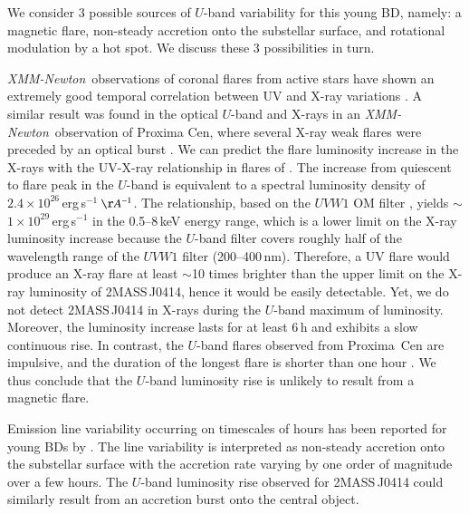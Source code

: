 \documentclass{aa}
\newcommand{\xmm}{{\it XMM-Newton}}
\begin{document}
We consider 3 possible sources of $U$-band variability for this young
BD, namely: a magnetic flare, non-steady accretion onto the substellar
surface, and rotational modulation by a hot spot. We discuss these 3
possibilities in turn.

\xmm~observations of coronal flares from active stars have shown an
extremely good temporal correlation between UV and X-ray variations
\citep{mitra05}. A similar result was found in the optical $U$-band
and X-rays in an \xmm~observation of Proxima Cen, where several X-ray
weak flares were preceded by an optical burst \citep{guedel04}. 
We can predict the flare luminosity increase in
the X-rays with the UV-X-ray relationship in flares of
\citet{mitra05}. The increase from quiescent to flare peak in the
$U$-band is equivalent to a spectral luminosity density of
$2.4\times10^{26}$\,erg\,s$^{-1}$\,$\AA^{-1}$. The \citet{mitra05}
relationship, based on the $UVW1$ OM filter \citep{ehle05}, yields
$\sim$$1\times 10^{29}$\,erg\,s$^{-1}$
in the 0.5--8\,keV energy range, which is a
lower limit on the X-ray luminosity increase because the $U$-band
filter covers roughly half of the wavelength range of the $UVW1$ filter
(200--400\,nm). Therefore, a UV flare would produce an X-ray flare at
least $\sim$10 times brighter than the upper limit on the X-ray
luminosity of 2MASS\,J0414, hence it would be easily detectable. Yet,
we do not detect 2MASS\,J0414 in X-rays during the $U$-band maximum of
luminosity. Moreover, the luminosity increase lasts for at least 6\,h
and exhibits a slow continuous rise. In contrast, the $U$-band flares
observed from Proxima~Cen are impulsive, and the duration of the
longest flare is shorter than one hour \citep{guedel04}. We thus
conclude that the $U$-band luminosity rise is unlikely to result from
a magnetic flare.

Emission line variability occurring on timescales of hours has
been reported for young BDs by \citet{scholz06}. The
line variability is interpreted as non-steady accretion onto the substellar
surface with the accretion rate varying by one order of magnitude over a few
hours. The $U$-band luminosity rise observed for 2MASS\,J0414 could
similarly result from an accretion burst onto the central object. 
\end{document}
